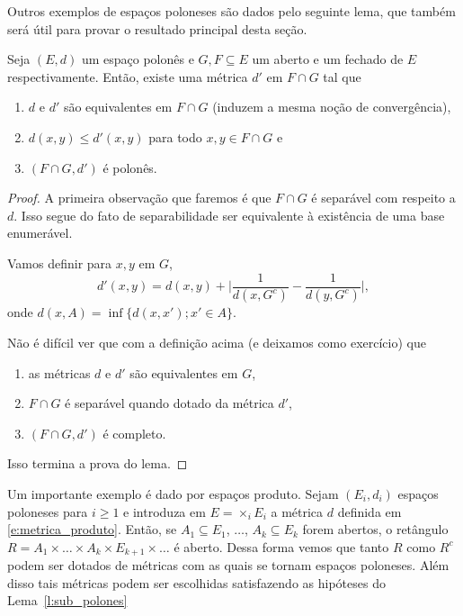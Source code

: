 Outros exemplos de espaços poloneses são dados pelo seguinte lema, que também será útil para provar o resultado principal desta seção.

\begin{lemma}
  \label{l:sub_polones}
  Seja $(E,d)$ um espaço polonês e $G, F \subseteq E$ um aberto e um fechado de $E$ respectivamente.
  Então, existe uma métrica $d'$ em $F \cap G$ tal que
  \begin{enumerate}[\quad a)]
  \item $d$ e $d'$ são equivalentes em $F \cap G$ (induzem a mesma noção de convergência),
  \item $d(x,y) \leq d'(x,y)$ para todo $x, y \in F \cap G$ e
  \item $(F \cap G, d')$ é polonês.
  \end{enumerate}
\end{lemma}

\begin{proof}
  A primeira observação que faremos é que $F \cap G$ é separável com respeito a $d$.
  Isso segue do fato de separabilidade ser equivalente à existência de uma base enumerável.

  Vamos definir para $x, y$ em $G$,
  \begin{equation}
    d'(x,y) = d(x,y) + \Big| \frac{1}{d(x,G^c)} - \frac{1}{d(y,G^c)} \Big|,
  \end{equation}
  onde $d(x,A) = \inf\{d(x,x'); x' \in A\}$.

  Não é difícil ver que com a definição acima (e deixamos como exercício) que
  \begin{enumerate}[\quad a)]
  \item as métricas $d$ e $d'$ são equivalentes em $G$,
  \item $F \cap G$ é separável quando dotado da métrica $d'$,
  \item $(F \cap G, d')$ é completo.
  \end{enumerate}
  Isso termina a prova do lema.
\end{proof}

\begin{example}
  Um importante exemplo é dado por espaços produto.
  Sejam $(E_i, d_i)$ espaços poloneses para $i \geq 1$ e introduza em $E = \times_i E_i$ a métrica $d$ definida em \eqref{e:metrica_produto}.
  Então, se $A_1 \subseteq E_1$, $\dots$, $A_k \subseteq E_k$ forem abertos, o retângulo $R = A_1 \times \dots \times A_k \times E_{k+1} \times \dots$ é aberto.
  Dessa forma vemos que tanto $R$ como $R^c$ podem ser dotados de métricas com as quais se tornam espaços poloneses.
  Além disso tais métricas podem ser escolhidas satisfazendo as hipóteses do Lema~\ref{l:sub_polones}
\end{example}

